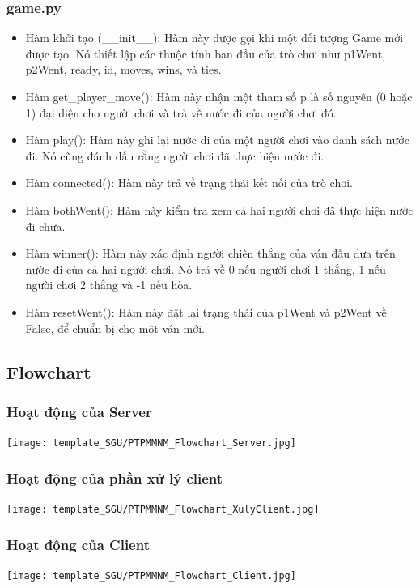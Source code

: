 \documentclass[a4paper]{article}
\begin{document}
\subsubsection{game.py}
\begin{itemize} 
    \item Hàm khởi tạo (\_\_init\_\_): Hàm này được gọi khi một đối tượng Game mới được tạo. Nó thiết lập các thuộc tính ban đầu của trò chơi như p1Went, p2Went, ready, id, moves, wins, và ties.
    \item Hàm get\_player\_move(): Hàm này nhận một tham số p là số nguyên (0 hoặc 1) đại diện cho người chơi và trả về nước đi của người chơi đó.
    \item Hàm play(): Hàm này ghi lại nước đi của một người chơi vào danh sách nước đi. Nó cũng đánh dấu rằng người chơi đã thực hiện nước đi.
    \item Hàm connected(): Hàm này trả về trạng thái kết nối của trò chơi.
    \item Hàm bothWent(): Hàm này kiểm tra xem cả hai người chơi đã thực hiện nước đi chưa.
    \item Hàm winner(): Hàm này xác định người chiến thắng của ván đấu dựa trên nước đi của cả hai người chơi. Nó trả về 0 nếu người chơi 1 thắng, 1 nếu người chơi 2 thắng và -1 nếu hòa.
    \item Hàm resetWent(): Hàm này đặt lại trạng thái của p1Went và p2Went về False, để chuẩn bị cho một ván mới.
\end{itemize}
\newpage
\subsection{Flowchart}
\subsubsection{Hoạt động của Server}
\begin{center}
    \texttt{[image: template\_SGU/PTPMMNM\_Flowchart\_Server.jpg]}
\end{center}
\subsubsection{Hoạt động của phần xử lý client}
\begin{center}
    \texttt{[image: template\_SGU/PTPMMNM\_Flowchart\_XulyClient.jpg]}
\end{center}
\subsubsection{Hoạt động của Client}
\begin{center}
    \texttt{[image: template\_SGU/PTPMMNM\_Flowchart\_Client.jpg]}
\end{center}
\end{document}

